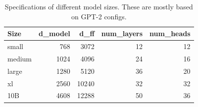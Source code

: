 \begin{table}
\caption{Specifications of different model sizes. These are mostly based on GPT-2 configs.}
\label{tab:model_spec}
\begin{tabular}{lrrrr}
\toprule
Size & d_model & d_ff & num_layers & num_heads \\
\midrule
small & 768 & 3072 & 12 & 12 \\
medium & 1024 & 4096 & 24 & 16 \\
large & 1280 & 5120 & 36 & 20 \\
xl & 2560 & 10240 & 32 & 32 \\
10B & 4608 & 12288 & 50 & 36 \\
\bottomrule
\end{tabular}
\end{table}
